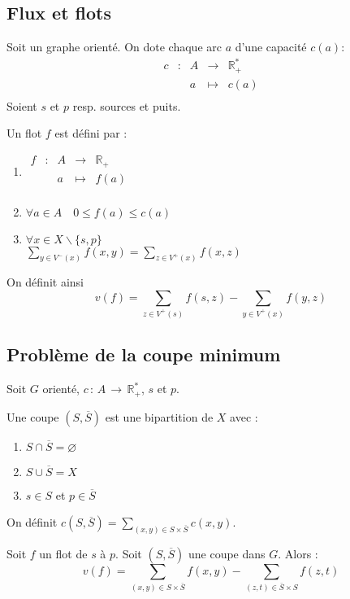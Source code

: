 \documentclass[a4paper, 8pt]{article}
\begin{document}
\begin{multicols*}{3}
\section*{Flux et flots}
\newcommand{\Sb}{\overline{S}}

Soit \GXA un graphe orienté. On dote chaque arc $a$ d'une capacité $c(a)$:
\[
\begin{array}{cc|ccl}
c & : & A & \to & \mathbb{R}^*_+  \\
 & & a & \mapsto & c(a) \\
\end{array}
\]
Soient $s$ et $p$ resp. sources et puits.

Un flot $f$ est défini par : \begin{enumerate}
\item $
\begin{array}{cc|ccl} 
f & : & A & \to & \mathbb{R}_+  \\
 & & a & \mapsto & f(a)\\
\end{array}
$
\item $\forall a \in A\quad 0 \leqslant f(a) \leqslant c(a) $
\item $\forall x \in X\backslash\{s,p\}$\\ 
 $\displaystyle\sum_{y\in V^-(x)}{f(x,y)} = \sum_{z\in V^+(x)}{f(x,z)}$
\end{enumerate}

On définit ainsi
\[v(f) = \displaystyle\sum_{z\in V^+(s)}{f(s,z)} - \sum_{y\in V^+(x)}{f(y,z)} \]

\subsection*{Problème de la coupe minimum}
Soit $G$ orienté, $c\, :\, A\, \rightarrow\, \mathbb{R}^*_+$, $s$ et $p$.

Une coupe $(S,\Sb)$ est une bipartition de $X$ avec :\begin{enumerate}
\item $S \cap \Sb = \varnothing$
\item $S \cup \Sb = X$
\item $s\in S$ et $p\in \Sb$
\end{enumerate}

On définit $c(S,\Sb) = \sum_{(x,y)\in S\times\Sb}{c(x,y)}$.

Soit $f$ un flot de $s$ à $p$. Soit $(S,\Sb)$ une coupe dans $G$. Alors :
\[ \displaystyle v(f) = \sum_{(x,y)\in S\times\Sb}{f(x,y)} - \sum_{(z,t)\in \Sb\times S}{f(z,t)} \]


\end{multicols*}
\end{document}

